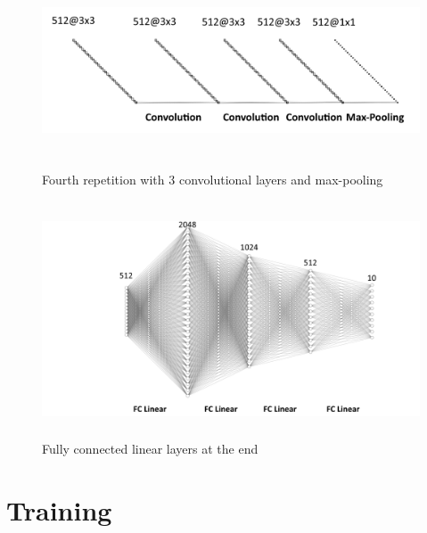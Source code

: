 \documentclass{tubaf-article}
\begin{document}
	\begin{figure}[htp]
		\centering
		\begin{minipage}{\textwidth}
			\centering
			\includegraphics[width=\textwidth, height=5cm]{final5.png}
			\caption{Fourth repetition with 3 convolutional layers and max-pooling}
		\end{minipage}
		
		\begin{minipage}{\textwidth}
			\centering
			\includegraphics[width=\textwidth, height=7cm]{final6.png}
			\caption{Fully connected linear layers at the end}
		\end{minipage}
	\end{figure}
	
	
	
	\section{Training}
	\label{training}
	
\end{document}
